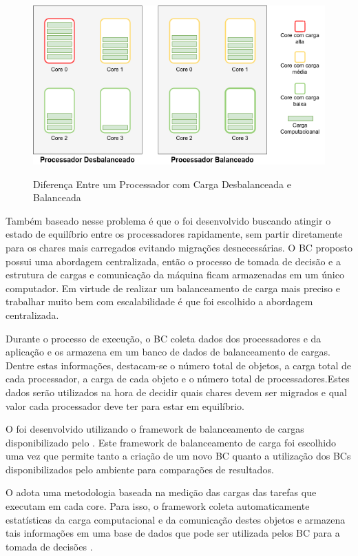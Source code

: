 \begin{figure}[!htb]
	\centering
	\caption{Diferença Entre um Processador com Carga Desbalanceada e Balanceada}
	\centering
	\includegraphics[scale=0.50]{figuras/load_balance.png}
	\label{img_load_balance_unbalance}
	\centering
\end{figure}

Também baseado nesse problema é que o \newlb foi desenvolvido buscando atingir o estado de equilíbrio entre os processadores rapidamente, sem partir diretamente para os chares mais carregados evitando migrações desnecessárias. O BC proposto possui uma abordagem centralizada, então o processo de tomada de decisão e a estrutura de cargas e comunicação da máquina ficam armazenadas em um único computador. Em virtude de realizar um balanceamento de carga mais preciso e trabalhar muito bem com escalabilidade é que foi escolhido a abordagem centralizada.

Durante o processo de execução, o BC coleta dados dos processadores e da aplicação
e os armazena em um banco de dados de balanceamento de cargas. Dentre estas informações,
destacam-se o número total de objetos, a carga total de cada processador, a carga de cada
objeto e o número total de processadores.Estes dados serão utilizados na hora de decidir quais chares devem ser migrados e qual valor cada processador deve ter para estar em equilíbrio.

O \newlb foi desenvolvido utilizando o framework de balanceamento de cargas disponibilizado pelo \charm. Este framework de balanceamento de carga foi escolhido uma vez que permite tanto a criação de um novo BC quanto a utilização dos BCs disponibilizados pelo ambiente para comparações de resultados.

O \charm adota uma metodologia baseada na medição das cargas das tarefas que executam em cada core. Para isso, o framework coleta automaticamente estatísticas da carga computacional e da comunicação destes objetos e armazena tais informações em uma base de dados que pode ser utilizada pelos BC para a tomada de decisões \cite{jyothi2004debugging}.


